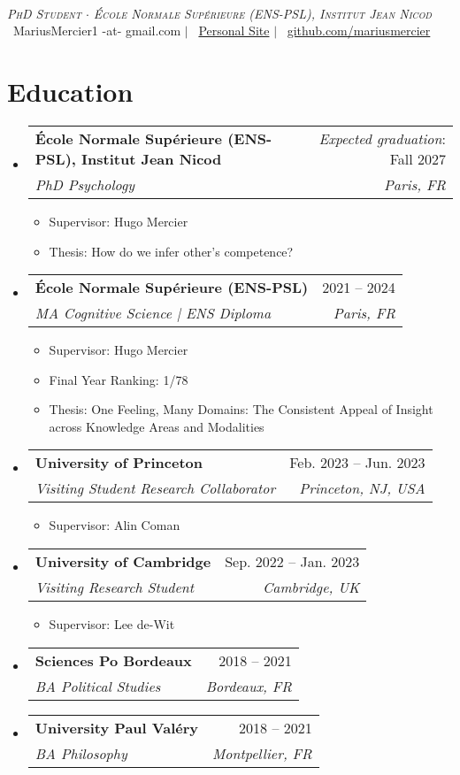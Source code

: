 \documentclass[letterpaper,11pt]{article}
\makeatletter
\newcommand{\resumeItem}[1]{
  \item\small{
    {#1 \vspace{-2pt}}
  }
}
\newcommand{\resumeSubheading}[4]{
  \vspace{1pt}\item
    \begin{tabular*}{0.97\textwidth}[t]{l@{\extracolsep{\fill}}r}
      \textbf{#1} & #2 \\
      \textit{\small#3} & \textit{\small #4} \\
    \end{tabular*}\vspace{-7pt}
}
\newcommand{\resumeSubHeadingListStart}{\begin{itemize}[leftmargin=0.15in, label={}]}
\newcommand{\resumeSubHeadingListEnd}{\end{itemize}}
\newcommand{\resumeItemListStart}{\begin{itemize}}
\newcommand{\resumeItemListEnd}{\end{itemize}\vspace{-5pt}}
\makeatother
\begin{document}

\begin{center}
     \\ \vspace{1pt}
    \textit{\scshape PhD Student $\cdot$ École Normale Supérieure (ENS-PSL), Institut Jean Nicod} \\ \vspace{1pt}
    \small 
    \faEnvelope\ MariusMercier1 -at- gmail.com $|$ 
    \faHome\ \href{https://mariusmercier.github.io/personal-site/}{Personal Site} $|$
    \faGithub\ \href{https://github.com/mariusmercier/}{github.com/mariusmercier}
\end{center}



\section{Education}
  \resumeSubHeadingListStart
    \resumeSubheading
      {École Normale Supérieure (ENS-PSL), Institut Jean Nicod}{\textit{Expected graduation}: Fall 2027}
      {PhD Psychology}{Paris, FR}
            \resumeItemListStart
        \resumeItem{Supervisor: Hugo Mercier}
        \resumeItem{Thesis: How do we infer other's competence?}
      \resumeItemListEnd
    \resumeSubheading
      {École Normale Supérieure (ENS-PSL)}{2021 -- 2024}
      {MA Cognitive Science | ENS Diploma}{Paris, FR}
            \resumeItemListStart
        \resumeItem{Supervisor: Hugo Mercier}
        \resumeItem{Final Year Ranking: 1/78}            
        \resumeItem{Thesis: One Feeling, Many Domains: The Consistent Appeal of Insight across Knowledge Areas and Modalities}
      \resumeItemListEnd
    \resumeSubheading
      {University of Princeton}{Feb. 2023 -- Jun. 2023}
      {Visiting Student Research Collaborator}{Princeton, NJ, USA}
          \resumeItemListStart
        \resumeItem{Supervisor: Alin Coman}
      \resumeItemListEnd
    \resumeSubheading
      {University of Cambridge}{Sep. 2022 -- Jan. 2023}
      {Visiting Research Student}{Cambridge, UK}
          \resumeItemListStart
        \resumeItem{Supervisor: Lee de-Wit}
      \resumeItemListEnd
    \resumeSubheading
      {Sciences Po Bordeaux}{2018 -- 2021}
      {BA Political Studies}{Bordeaux, FR}
    \resumeSubheading
      {University Paul Valéry}{2018 -- 2021}
      {BA Philosophy}{Montpellier, FR}
  \resumeSubHeadingListEnd
\end{document}
